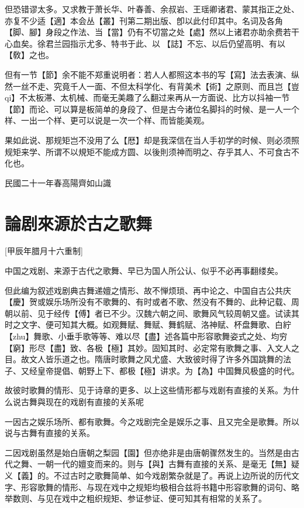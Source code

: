 \documentclass{zhvt-classic}
\begin{document}
但恐错谬太多。又求教于萧长华、叶春善、余叔岩、王瑶卿诸君、蒙其指正之处、亦复不少适【適】本会丛【叢】刊第二期出版、卽以此付印其中。名词及各角【脚、腳】身段之作法、当【當】仍有不切當之处【處】然以上诸君亦助余费若干心血矣。徐君兰园指示尤多、特书于此、以𰵧【誌】不忘、以后仍望高明、有以【敎】之也。

但有一节【節】余不能不郑重说明者：若人人都照这本书的写【寫】法去表演、纵然一丝不走、究竟千人一面、不但太科学化、有背美术【術】之原则、而且岂【豈qi】不太板滞、太机械、而毫无美趣了么翻过来再从一方面说、比方以抖袖一节【節】而论、可以算是板简单的身段了、但是古今诸位名脚抖的时候、是一人一个样、一出一个样、更可以说是一次一个样、而皆能美观。

果如此说、那规矩岂不没用了么【厯】却是我深信在当人手初学的时候、则必须照规矩来学、所谓不以規矩不能成方圆、以後則须神而明之、存乎其人、不可食古不化也。

民國二十一年春高陽齊如山識

\chapter*[第一章]{論剧來源於古之歌舞}[甲辰年腊月十六重制]
\begin{preface}
中国之戏剧、来源于古代之歌舞、早已为国人所公认、似乎不必再事翻缕矣。
\end{preface}

但此编为叙述戏剧典古舞递嬗之情形、故不惮烦琐、再中论之、中国自古公共庆【慶】贺或娱乐场所没有不歌舞的、有时或者不歌、然没有不舞的、此种记载、周朝以前、见于经传【傅】者已不少。汉魏六朝之间、歌舞风气较周朝又盛。试读其时之文字、便可知其大概。如观舞赋、舞赋、舞鹤赋、洛神赋、杯盘舞歌、白紵【zhu】舞歌、小垂手歌等等、难以尽【盡】述各篇中形容歌舞姿式之处、均穷【窮】形尽【盡】致、各极【極】其妙。固知其时、必定常有歌舞之事、入文人之目。故文人皆乐道之也。隋唐时歌舞之风尤盛、大致彼时得了许多外国跳舞的法子、又经皇帝提倡、朝野上下、都极【極】讲求。为【為】中国舞风极盛的时代。

故彼时歌舞的情形、见于诗章的更多、以上这些情形都与戏剧有直接的关系。为什么说古舞與现在的戏剧有直接的关系呢

一因古之娱乐场所、都有歌舞。今之戏剧完全是娱乐之事、且又完全是歌舞。所以说与古舞有直接的关系。

二因戏剧虽然是始白唐朝之梨园【園】但亦绝非是由唐朝骤然发生的。当然是由古代之舞、一朝一代的嬗变而来的。则与【與】古舞有直接的关系、是毫无【無】疑义【義】的。不过古时之歌舞简单、如今戏剧繁杂就是了。再说上边所说的历代文字、形容歌舞的情形、与现在戏中之规矩均极相合兹将书籍中形容歌舞的词句、略举数则、与见在戏中之粗织规矩、参证参证、便可知其有相常的关系了。
\end{document}
